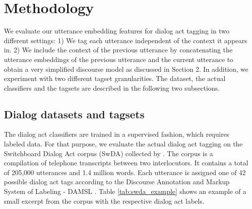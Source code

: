 \section{Methodology}\label{sec:method}
%

We evaluate our utterance embedding features for dialog act tagging in two different settings:
1) We tag each utterance independent of the context it appears in.
2) We include the context of the previous utterance by concatenating the utterance embeddings of the previous utterance and the current utterance to obtain a very simplified discourse model as discussed in Section 2.
In addition, we experiment with two different tagset granularities.
The dataset, the actual classifiers and the tagsets are described in the following two subsections.

\subsection{Dialog datasets and tagsets}

The dialog act classifiers are trained in a supervised fashion, which requires labeled data.
For that purpose, we evaluate the actual dialog act tagging on the Switchboard Dialog Act corpus (SwDA) collected by .
The corpus is a compilation of telephone transcripts between two interlocutors.
It contains a total of 205,000 utterances and 1.4 million words.
Each utterance is assigned one of 42 possible dialog act tags according to the Discourse Annotation and Markup System of Labeling - DAMSL \cite{core1997coding}.
Table \ref{tab:swda_example} shows an example of a small excerpt from the corpus with the respective dialog act labels. 

